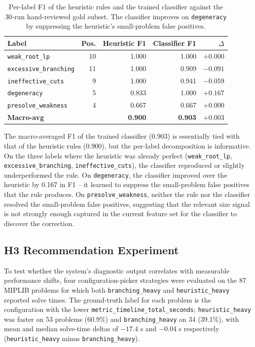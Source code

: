 \documentclass[11pt]{article}
\begin{document}
\begin{table}[h]
\centering
\begin{tabular}{lrrrr}
\toprule
\textbf{Label} & \textbf{Pos.} & \textbf{Heuristic F1} & \textbf{Classifier F1} & \textbf{$\Delta$} \\
\midrule
\texttt{weak\_root\_lp}        & 10 & 1.000 & 1.000 & $+0.000$ \\
\texttt{excessive\_branching}  & 11 & 1.000 & 0.909 & $-0.091$ \\
\texttt{ineffective\_cuts}     &  9 & 1.000 & 0.941 & $-0.059$ \\
\texttt{degeneracy}            &  5 & 0.833 & 1.000 & $+0.167$ \\
\texttt{presolve\_weakness}    &  4 & 0.667 & 0.667 & $+0.000$ \\
\midrule
\textbf{Macro-avg}             &    & \textbf{0.900} & \textbf{0.903} & $+0.003$ \\
\bottomrule
\end{tabular}
\caption{Per-label F1 of the heuristic rules and the trained classifier against the 30-run hand-reviewed gold subset. The classifier improves on \texttt{degeneracy} by suppressing the heuristic's small-problem false positives.}
\label{tab:gold_compare}
\end{table}

The macro-averaged F1 of the trained classifier (0.903) is essentially tied with that of the heuristic rules (0.900), but the per-label decomposition is informative. On the three labels where the heuristic was already perfect (\texttt{weak\_root\_lp}, \texttt{excessive\_branching}, \texttt{ineffective\_cuts}), the classifier reproduced or slightly underperformed the rule. On \texttt{degeneracy}, the classifier improved over the heuristic by 0.167 in F1 -- it learned to suppress the small-problem false positives that the rule produces. On \texttt{presolve\_weakness}, neither the rule nor the classifier resolved the small-problem false positives, suggesting that the relevant size signal is not strongly enough captured in the current feature set for the classifier to discover the correction.

\subsection{H3 Recommendation Experiment}

To test whether the system's diagnostic output correlates with measurable performance shifts, four configuration-picker strategies were evaluated on the 87 MIPLIB problems for which both \texttt{branching\_heavy} and \texttt{heuristic\_heavy} reported solve times. The ground-truth label for each problem is the configuration with the lower \texttt{metric\_timeline\_total\_seconds}; \texttt{heuristic\_heavy} was faster on 53 problems (60.9\%) and \texttt{branching\_heavy} on 34 (39.1\%), with mean and median solve-time deltas of $-17.4$ s and $-0.04$ s respectively (\texttt{heuristic\_heavy} minus \texttt{branching\_heavy}).
\end{document}

